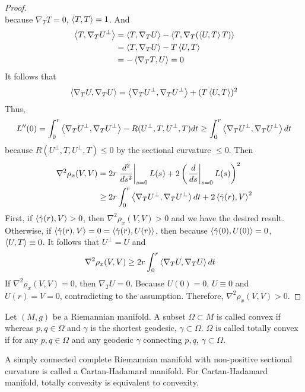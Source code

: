 \begin{enumerate}[label=\arabic{*}.]
\begin{proof}
\begin{equation*}
		\end{equation*}
		because $\nabla_TT = 0$, $\left\langle T,T \right\rangle = 1$. And
		\begin{equation*}
			\begin{aligned}
				\left\langle T,\nabla_TU^\perp \right\rangle & = \left\langle T,\nabla_TU \right\rangle - \left\langle T,\nabla_T(\left\langle U,T \right\rangle T) \right\rangle \\
				&= \left\langle T,\nabla_TU \right\rangle - T\left\langle U,T \right\rangle \\
				&= -\left\langle \nabla_TT,U \right\rangle = 0
			\end{aligned}
		\end{equation*}
		It follows that
		\begin{equation*}
			\left\langle \nabla_TU,\nabla_TU \right\rangle = \left\langle \nabla_TU^\perp,\nabla_TU^\perp \right\rangle + (T\left\langle U,T \right\rangle)^2 
		\end{equation*}
		Thus,
		\begin{equation*}
			L^{\prime\prime}(0) = \int_0^r \left\langle \nabla_TU^\perp,\nabla_TU^\perp \right\rangle - R(U^\perp,T,U^\perp,T)dt \geq \int_0^r \left\langle \nabla_TU^\perp,\nabla_TU^\perp \right\rangle dt
		\end{equation*}
		because $R(U^\perp,T,U^\perp,T) \leq 0$ by the sectional curvature $\leq 0$. Then
		\begin{equation*}
			\begin{aligned}
				\nabla^2\rho_x(V,V) &= 2r\left.\frac{d^2}{ds^2}\right\lvert_{s=0}L(s) + 2\left(\left.\frac{d}{ds}\right\lvert_{s=0}L(s)\right)^2 \\
				&\geq 2r\int_0^r \left\langle \nabla_TU^\perp,\nabla_TU^\perp \right\rangle dt + 2\left\langle \dot{\gamma}(r),V \right\rangle^2
			\end{aligned}
		\end{equation*}
		First, if $\left\langle \dot{\gamma}(r),V \right\rangle > 0$, then $\nabla^2\rho_x(V,V) > 0$ and we have the desired result. Otherwise, if $\left\langle \dot{\gamma}(r),V \right\rangle = 0 = \left\langle \dot{\gamma}(r),U(r) \right\rangle$, then because $\left\langle \dot{\gamma}(0),U(0) \right\rangle = 0$, $\left\langle U,T \right\rangle \equiv 0$. It follows that $U^\perp = U$ and
		\begin{equation*}
			\begin{aligned}
				\nabla^2\rho_x(V,V) &\geq 2r\int_0^r \left\langle \nabla_TU,\nabla_TU \right\rangle dt 
			\end{aligned}
		\end{equation*}
		If $\nabla^2\rho_x(V,V) = 0$, then $\nabla_TU = 0$. Because $U(0) = 0$, $U \equiv 0$ and $U(r) = V = 0$, contradicting to the assumption. Therefore, $\nabla^2\rho_x(V,V) > 0$.
	\end{proof}
	
	\begin{defn}
		Let $(M,g)$ be a Riemannian manifold. A subset $\Omega \subset M$ is called convex if whereas $p,q \in \Omega$ and $\gamma$ is the shortest geodesic, $\gamma \subset \Omega$. $\Omega$ is called totally convex if for any $p,q \in \Omega$ and any geodesic $\gamma$ connecting $p,q$, $\gamma \subset \Omega$.
	\end{defn}
	\begin{rmk}
		A simply connected complete Riemannian manifold with non-positive sectional curvature is called a Cartan-Hadamard manifold. For Cartan-Hadamard manifold, totally convexity is equivalent to convexity.
	\end{rmk}


\end{enumerate}
